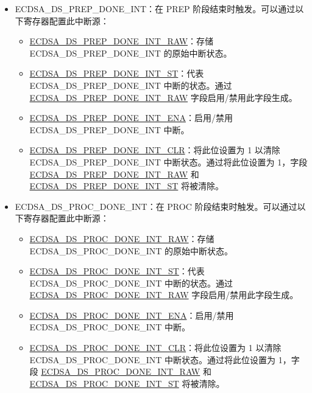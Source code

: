 \documentclass[main\_\_CN.tex]{subfiles}
\begin{document}
\begin{itemize}
	\item \label{int:ECDSADSPREPDONEINT}ECDSA\_DS\_PREP\_DONE\_INT：在 PREP 阶段结束时触发。可以通过以下寄存器配置此中断源：
	      \begin{itemize}
		      \item \hyperref[fielddesc:ECDSADSPREPDONEINTRAW]{ECDSA\_DS\_PREP\_DONE\_INT\_RAW}：存储 ECDSA\_DS\_PREP\_DONE\_INT 的原始中断状态。
		      \item \hyperref[fielddesc:ECDSADSPREPDONEINTST]{ECDSA\_DS\_PREP\_DONE\_INT\_ST}：代表 ECDSA\_DS\_PREP\_DONE\_INT 中断的状态。通过 \hyperref[fielddesc:ECDSADSPREPDONEINTRAW]{ECDSA\_DS\_PREP\_DONE\_INT\_RAW} 字段启用/禁用此字段生成。
		      \item \hyperref[fielddesc:ECDSADSPREPDONEINTENA]{ECDSA\_DS\_PREP\_DONE\_INT\_ENA}：启用/禁用 ECDSA\_DS\_PREP\_DONE\_INT 中断。
		      \item \hyperref[fielddesc:ECDSADSPREPDONEINTCLR]{ECDSA\_DS\_PREP\_DONE\_INT\_CLR}：将此位设置为 1 以清除 ECDSA\_DS\_PREP\_DONE\_INT 中断状态。通过将此位设置为 1，字段 \hyperref[fielddesc:ECDSADSPREPDONEINTRAW]{ECDSA\_DS\_PREP\_DONE\_INT\_RAW} 和 \hyperref[fielddesc:ECDSADSPREPDONEINTST]{ECDSA\_DS\_PREP\_DONE\_INT\_ST} 将被清除。
	      \end{itemize}
          \item \label{int:ECDSADSPROCDONEINT}ECDSA\_DS\_PROC\_DONE\_INT：在 PROC 阶段结束时触发。可以通过以下寄存器配置此中断源：
	      \begin{itemize}
		      \item \hyperref[fielddesc:ECDSADSPROCDONEINTRAW]{ECDSA\_DS\_PROC\_DONE\_INT\_RAW}：存储 ECDSA\_DS\_PROC\_DONE\_INT 的原始中断状态。
		      \item \hyperref[fielddesc:ECDSADSPROCDONEINTST]{ECDSA\_DS\_PROC\_DONE\_INT\_ST}：代表 ECDSA\_DS\_PROC\_DONE\_INT 中断的状态。通过 \hyperref[fielddesc:ECDSADSPROCDONEINTRAW]{ECDSA\_DS\_PROC\_DONE\_INT\_RAW} 字段启用/禁用此字段生成。
		      \item \hyperref[fielddesc:ECDSADSPROCDONEINTENA]{ECDSA\_DS\_PROC\_DONE\_INT\_ENA}：启用/禁用 ECDSA\_DS\_PROC\_DONE\_INT 中断。
		      \item \hyperref[fielddesc:ECDSADSPROCDONEINTCLR]{ECDSA\_DS\_PROC\_DONE\_INT\_CLR}：将此位设置为 1 以清除 ECDSA\_DS\_PROC\_DONE\_INT 中断状态。通过将此位设置为 1，字段 \hyperref[fielddesc:ECDSADSPROCDONEINTRAW]{ECDSA\_DS\_PROC\_DONE\_INT\_RAW} 和 \hyperref[fielddesc:ECDSADSPROCDONEINTST]{ECDSA\_DS\_PROC\_DONE\_INT\_ST} 将被清除。

\end{itemize}
\end{itemize}
\end{document}
